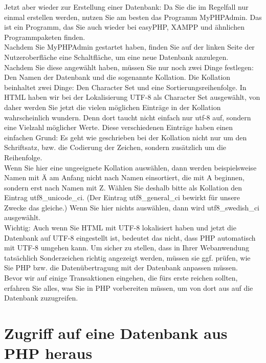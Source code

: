 Jetzt aber wieder zur Erstellung einer Datenbank: Da Sie die im Regelfall nur einmal erstellen werden, nutzen Sie am besten das Programm MyPHPAdmin. Das ist ein Programm, das Sie auch wieder bei easyPHP, XAMPP und ähnlichen Programmpaketen finden.\\

Nachdem Sie MyPHPAdmin gestartet haben, finden Sie auf der linken Seite der Nutzeroberfläche eine Schaltfläche, um eine neue Datenbank anzulegen.\\

Nachdem Sie diese angewählt haben, müssen Sie nur noch zwei Dinge festlegen: Den Namen der Datenbank und die sogenannte Kollation. Die Kollation beinhaltet zwei Dinge: Den Character Set und eine Sortierungsreihenfolge. In HTML haben wir bei der Lokalisierung UTF-8 als Character Set ausgewählt, von daher werden Sie jetzt die vielen möglichen Einträge in der Kollation wahrscheinlich wundern. Denn dort taucht nicht einfach nur utf-8 auf, sondern eine Vielzahl möglicher Werte. Diese verschiedenen Einträge haben einen einfachen Grund: Es geht wie geschrieben bei der Kollation nicht nur um den Schriftsatz, bzw. die Codierung der Zeichen, sondern zusätzlich um die Reihenfolge.\\

Wenn Sie hier eine ungeeignete Kollation auswählen, dann werden beispielsweise Namen mit Ä am Anfang nicht nach Namen einsortiert, die mit A beginnen, sondern erst nach Namen mit Z. Wählen Sie deshalb bitte als Kollation den Eintrag utf8\_unicode\_ci. (Der Eintrag utf8\_general\_ci bewirkt für unsere Zwecke das gleiche.) Wenn Sie hier nichts auswählen, dann wird utf8\_swedish\_ci ausgewählt.\\

Wichtig: Auch wenn Sie HTML mit UTF-8 lokalisiert haben und jetzt die Datenbank auf UTF-8 eingestellt ist, bedeutet das nicht, dass PHP automatisch mit UTF-8 umgehen kann. Um sicher zu stellen, dass in Ihrer Webanwendung tatsächlich Sonderzeichen richtig angezeigt werden, müssen sie ggf. prüfen, wie Sie PHP bzw. die Datenübertragung mit der Datenbank anpassen müssen.\\

Bevor wir auf einige Transaktionen eingehen, die fürs erste reichen sollten, erfahren Sie alles, was Sie in PHP vorbereiten müssen, um von dort aus auf die Datenbank zuzugreifen.

\section{Zugriff auf eine Datenbank aus PHP heraus}

